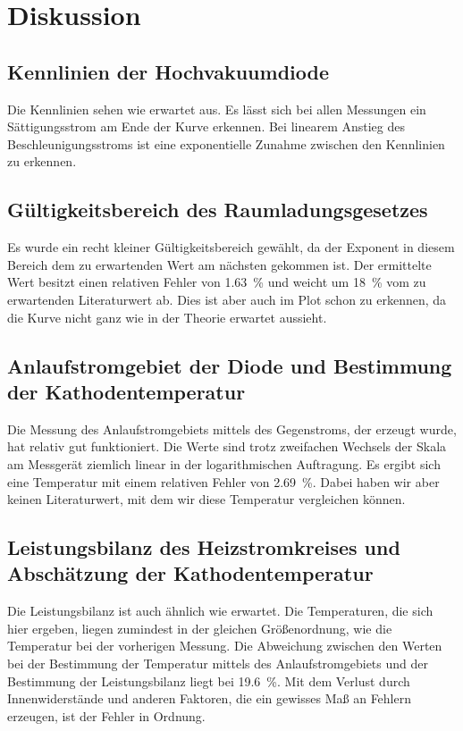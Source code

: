 \section{Diskussion}
\label{sec:Diskussion}

\subsection{Kennlinien der Hochvakuumdiode}
Die Kennlinien sehen wie erwartet aus. Es lässt sich bei allen Messungen ein Sättigungsstrom am Ende der Kurve erkennen. 
Bei linearem Anstieg des Beschleunigungsstroms ist eine exponentielle Zunahme zwischen den Kennlinien zu erkennen. %

\subsection{Gültigkeitsbereich des Raumladungsgesetzes}
Es wurde ein recht kleiner Gültigkeitsbereich gewählt, da der Exponent in diesem Bereich dem zu erwartenden Wert am 
nächsten gekommen ist. 
Der ermittelte Wert besitzt einen relativen Fehler von \SI{1.63}{\percent} und weicht um \SI{18}{\percent} vom zu 
erwartenden Literaturwert ab. 
Dies ist aber auch im Plot schon zu erkennen, da die Kurve nicht ganz wie in der Theorie erwartet aussieht. 

\subsection{Anlaufstromgebiet der Diode und Bestimmung der Kathodentemperatur}
Die Messung des Anlaufstromgebiets mittels des Gegenstroms, der erzeugt wurde, hat relativ gut funktioniert. 
Die Werte sind trotz zweifachen Wechsels der Skala am Messgerät ziemlich linear in der logarithmischen Auftragung. 
Es ergibt sich eine Temperatur mit einem relativen Fehler von \SI{2.69}{\percent}. Dabei haben wir aber keinen 
Literaturwert, mit dem wir diese Temperatur vergleichen können. %

\subsection{Leistungsbilanz des Heizstromkreises und Abschätzung der Kathodentemperatur}
Die Leistungsbilanz ist auch ähnlich wie erwartet. Die Temperaturen, die sich hier ergeben, liegen zumindest in der 
gleichen Größenordnung, wie die Temperatur bei der vorherigen Messung. Die Abweichung zwischen den Werten bei der 
Bestimmung der Temperatur mittels des Anlaufstromgebiets und der Bestimmung der Leistungsbilanz liegt bei 
\SI{19.6}{\percent}. Mit dem Verlust durch Innenwiderstände und anderen Faktoren, die ein gewisses Maß an Fehlern 
erzeugen, ist der Fehler in Ordnung. %


